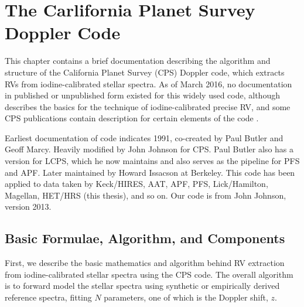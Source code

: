 \chapter{The Carlifornia Planet Survey Doppler Code}\label{chap:doppler}

This chapter contains a brief documentation describing the algorithm
and structure of the California Planet Survey (CPS) Doppler code,
which extracts RVs from iodine-calibrated stellar spectra. As of March
2016, no documentation in published or unpublished form existed for
this widely used code, although \cite{butler1996} describes the basics
for the technique of iodine-calibrated precise RV, and some CPS
publications contain description for certain elements of the code
\citep[e.g.,][]{2006ApJ...647..600J, 2009ApJ...696...75H, 2011ApJ...726...73H,
  2011ApJS..197...26J}.

Earliest documentation of code indicates 1991, co-created by Paul
Butler and Geoff Marcy. Heavily modified by John Johnson for CPS. Paul
Butler also has a version for LCPS, which he now maintains and also
serves as the pipeline for PFS and APF. Later maintained by Howard
Issacson at Berkeley. This code has been applied to data taken by
Keck/HIRES, AAT, APF, PFS, Lick/Hamilton, Magellan, HET/HRS (this
thesis), and so on. Our code is from John Johnson, version 2013.


\section{Basic Formulae, Algorithm, and Components}

First, we describe the basic mathematics and algorithm behind RV
extraction from iodine-calibrated stellar spectra using the CPS
code. The overall algorithm is to forward model the stellar spectra
using synthetic or empirically derived reference spectra, fitting $N$
parameters, one of which is the Doppler shift, $z$.

